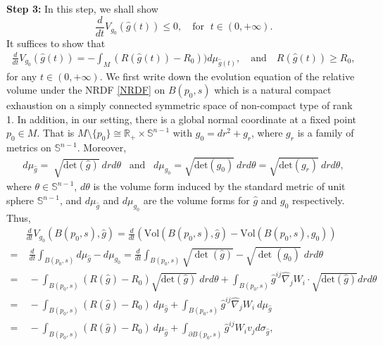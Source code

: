 \documentclass[12pt]{amsart}
\begin{document}
\textbf{Step 3: } In this step, we shall show 
\begin{equation}\label{non-increasing of relative volume}
    \frac{d}{dt}V_{g_0}(\hat{g}(t)) \leq 0,\quad \text{for }\; t\in (0, +\infty). 
\end{equation}
It suffices to show that 
\begin{equation}
    \begin{split}
        \frac{d}{dt}V_{g_0}(\hat{g}(t)) = -\int_{M} (R(\hat{g}(t)) - R_0)) d\mu_{\hat{g}(t)},\quad \text{and}\quad R(\hat{g}(t)) \geq R_0,
    \end{split}
\end{equation}
for any $t\in (0, +\infty)$. We first write down the evolution equation of the relative volume under the NRDF \eqref{NRDF} on $B(p_0, s)$ which is a natural compact exhaustion on a simply connected symmetric space of non-compact type of rank 1. In addition, in our setting, there is a global normal coordinate at a fixed point $p_0\in M$. That is $M\setminus \{p_0\} \cong \mathbb{R}_+ \times \mathbb{S}^{n - 1}$ with $g_0 = dr^2 + g_r$, where $g_r$ is a family of metrics on $\mathbb{S}^{n - 1}$. Moreover, 
\begin{align*}
    d\mu_{\hat{g}} =\; \sqrt{\mathrm{det}(\hat{g})}\ dr d\theta\;\;\; \text{and}\;\;\;
    d\mu_{g_0} = \sqrt{\mathrm{det}(g_0)}\ drd\theta = \sqrt{\mathrm{det}(g_r)}\ dr d\theta, 
\end{align*}
where $\theta\in \mathbb{S}^{n - 1}$, $d\theta$ is the volume form induced by the standard metric of unit sphere $\mathbb{S}^{n - 1}$, and $d\mu_{\hat{g}}$ and $d\mu_{g_0}$ are the volume forms for $\hat{g}$ and $g_0$ respectively. Thus, 
\begin{equation}\label{final proof formula 1}
    \begin{split}
        &\frac{d}{dt}V_{g_0}(B(p_0, s), \hat{g}) = \frac{d}{dt}(\mathrm{Vol}(B(p_0, s), \hat{g}) - \mathrm{Vol}(B(p_0, s), g_0))\\
        =&\; \frac{d}{dt}\int_{B(p_0, s)} d\mu_{\hat{g}} - d\mu_{g_0} = \frac{d}{dt}\int_{B(p_0, s)} \sqrt{\det(\hat{g})} - \sqrt{\det(g_0)}\;dr d\theta\\
        =&\; -\int_{B(p_0, s)}(R(\hat{g}) - R_0)\sqrt{\mathrm{det}(\hat{g})} \ drd\theta+\int_{B(p_0, s)} \hat{g}^{ij}\hat{\nabla}_{j} W_{i}\cdot \sqrt{\mathrm{det}(\hat{g})} drd\theta\\
        =&\; -\int_{B(p_0, s)}(R(\hat{g}) - R_0)\ d\mu_{\hat{g}} + \int_{B(p_0, s)} \hat{g}^{ij}\hat{\nabla}_{j} W_{i}\ d\mu_{\hat{g}}\\
        =&\; -\int_{B(p_0, s)}(R(\hat{g}) - R_0) \ d\mu_{\hat{g}} + \int_{\partial B(p_0, s)} \hat{g}^{ij} W_{i} v_{j} d\sigma_{\hat{g}},
    \end{split}
\end{equation}
\end{document}
